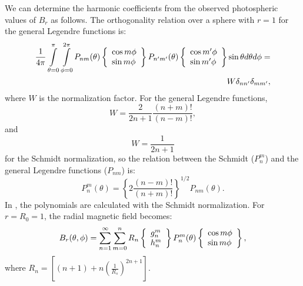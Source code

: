 We can determine the harmonic coefficients from the observed photospheric 
values of $B_r$ as follows. The orthogonality relation over a sphere with 
$r=1$ for the general Legendre functions is:
\begin{eqnarray}
\label{eq:SphNorm}
\frac{1}{4\pi}\mathop{\int}_{\theta=0}^{\pi}\mathop{\int}_{\phi=0}^{2\pi}
P_{nm}(\theta)  \left\{ \begin{array}{l l}  \cos{m\phi}\\  \sin{m\phi}\\ 
\end{array} 
\right\}
P_{n'm'}(\theta) \left\{ \begin{array}{l l}  \cos{m'\phi}\\  \sin{m'\phi}\\ 
\end{array} 
\right\}
\sin{\theta} d\theta d\phi= \nonumber \\
W\delta_{nn'}\delta_{mm'},
\end{eqnarray}
where $W$ is the normalization factor.
For the general Legendre functions,
\begin{equation}
\label{eq:GenNorm}
W=\frac{2}{2n+1}\frac{(n+m)!}{(n-m)!},
\end{equation}
and
\begin{equation}
\label{eq:SchmidtNorm}
W=\frac{1}{2n+1}
\end{equation}
for the Schmidt normalization, so the relation between the Schmidt ($P_n^m$) 
and the general Legendre functions ($P_{nm}$) is:
\begin{equation}
\label{eq:NormRel}
P_n^m(\theta)=\left\{ 2 \frac{(n-m)!}{(n+m)!} \right\} ^{1/2}P_{nm}(\theta).
\end{equation}
In \BATSRUS, the polynomials are calculated with 
the Schmidt normalization.  
For $r=R_0=1$, the radial magnetic field becomes:
\begin{equation}
\label{eq:BrSum}
B_r(\theta,\phi)= \mathop{\sum}_{n=1}^{\infty}\mathop{\sum}_{m=0}^{n}
R_n\left\{ \begin{array}{l l}  g_n^m\\  h_n^m\\ \end{array} \right\}P_n^m
(\theta)\left\{ \begin{array}{l l}  \cos{m\phi}\\  \sin{m\phi}\\ \end{array} 
\right\},
\end{equation}
where $R_n=\left[ (n+1)+n\left( \frac{1}{R_s} \right)^{2n+1}  \right]$.\\
